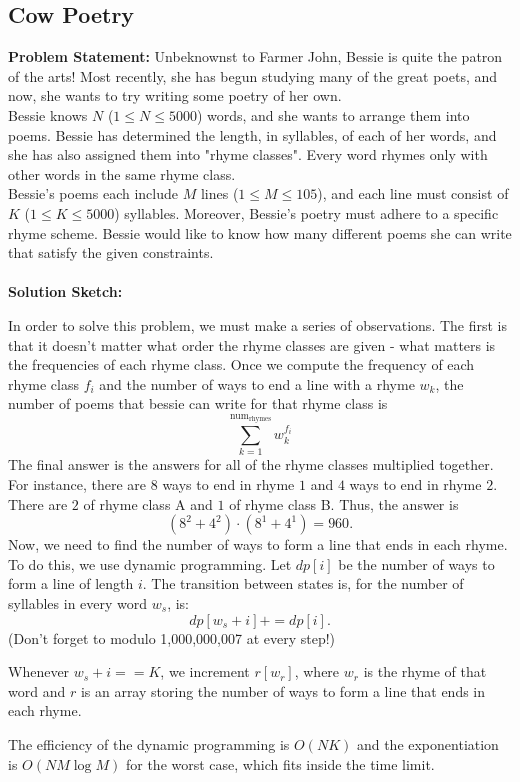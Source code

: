 \documentclass{article}
\begin{document}
\subsection{Cow Poetry}
\textbf{Problem Statement:}
Unbeknownst to Farmer John, Bessie is quite the patron of the arts! Most recently, she has begun studying many of the great poets, and now, she wants to try writing some poetry of her own. \\ Bessie knows $N$ ($1 \leq N \leq 5000$) words, and she wants to arrange them into poems. Bessie has determined the length, in syllables, of each of her words, and she has also assigned them into "rhyme classes". Every word rhymes only with other words in the same rhyme class. \\ Bessie's poems each include $M$ lines ($1 \leq M \leq 105$), and each line must consist of $K$ ($1 \leq K \leq 5000$) syllables. Moreover, Bessie's poetry must adhere to a specific rhyme scheme. Bessie would like to know how many different poems she can write that satisfy the given constraints.\\\\
\textbf{Solution Sketch:} 

In order to solve this problem, we must make a series of observations. The first is that it doesn’t matter what order the rhyme classes are given - what matters is the frequencies of each rhyme class. Once we compute the frequency of each rhyme class $f_i$ and the number of ways to end a line with a rhyme $w_k$, the number of poems that bessie can write for that rhyme class is $$\sum_{k=1}^{\text{num}_{\text{rhymes}}} w_k^{f_i}$$
The final answer is the answers for all of the rhyme classes multiplied together. For instance, there are $8$ ways to end in rhyme $1$ and $4$ ways to end in rhyme $2$. There are $2$ of rhyme class A and $1$ of rhyme class B. Thus, the answer is $$(8^2+4^2)⋅(8^1+4^1)=960.$$
Now, we need to find the number of ways to form a line that ends in each rhyme. To do this, we use dynamic programming. Let $dp[i]$ be the number of ways to form a line of length $i$. The transition between states is, for the number of syllables in every word $w_s$, is: $$dp[w_s+i]+=dp[i].$$ (Don’t forget to modulo 1,000,000,007 at every step!)

Whenever $w_s+i==K$, we increment $r[w_r]$, where $w_r$ is the rhyme of that word and $r$ is an array storing the number of ways to form a line that ends in each rhyme.

The efficiency of the dynamic programming is $O(NK)$ and the exponentiation is $O(NM\log M)$ for the worst case, which fits inside the time limit.
\end{document}
